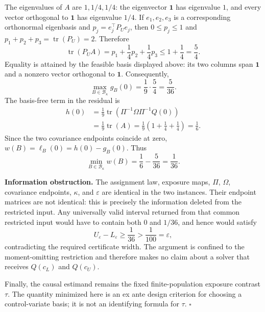 The eigenvalues of \(A\) are \(1,1/4,1/4\): the eigenvector \(\mathbf 1\) has eigenvalue \(1\), and every vector orthogonal to \(\mathbf 1\) has eigenvalue \(1/4\).  If \(e_1,e_2,e_3\) is a corresponding orthonormal eigenbasis and \(p_j=e_j^{\top}P_Ue_j\), then \(0\le p_j\le1\) and \(p_1+p_2+p_3=\operatorname{tr}(P_U)=2\).  Therefore
\[
\operatorname{tr}(P_UA)
=p_1+\frac14p_2+\frac14p_3
\le1+\frac14=\frac54.
\]
Equality is attained by the feasible basis displayed above: its two columns span \(\mathbf 1\) and a nonzero vector orthogonal to \(\mathbf 1\).  Consequently,
\[
\max_{B\in\mathcal B_\kappa}g_B(0)=\frac1{9}\cdot\frac54=\frac5{36}.
\]
The basis-free term in the residual is
\[
\begin{aligned}
h(0)
&=\frac1{9}\operatorname{tr}\!\left(\Pi^{-1}\Omega\Pi^{-1}Q(0)\right)\\
&=\frac1{9}\operatorname{tr}(A)
=\frac1{9}\left(1+\frac14+\frac14\right)
=\frac16.
\end{aligned}
\]
Since the two covariance endpoints coincide at zero, \(w(B)=\ell_B(0)=h(0)-g_B(0)\).  Thus
\[
\min_{B\in\mathcal B_\kappa}w(B)
=\frac16-\frac5{36}
=\frac1{36}.
\]

\textbf{Information obstruction.}
The assignment law, exposure maps, \(\Pi\), \(\Omega\), covariance endpoints, \(\kappa\), and \(\varepsilon\) are identical in the two instances.  Their endpoint matrices are not identical: this is precisely the information deleted from the restricted input.  Any universally valid interval returned from that common restricted input would have to contain both \(0\) and \(1/36\), and hence would satisfy
\[
U_{\varepsilon}-L_{\varepsilon}\ge\frac1{36}>\frac1{100}=\varepsilon,
\]
contradicting the required certificate width.  The argument is confined to the moment-omitting restriction and therefore makes no claim about a solver that receives \(Q(c_L)\) and \(Q(c_U)\).

Finally, the causal estimand remains the fixed finite-population exposure contrast \(\tau\).  The quantity minimized here is an ex ante design criterion for choosing a control-variate basis; it is not an identifying formula for \(\tau\).  \(\square\)
